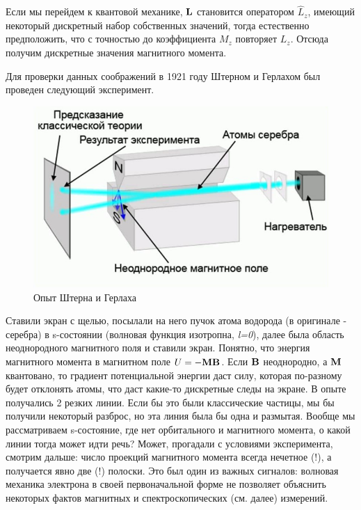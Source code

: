 \par Если мы перейдем к квантовой механике, $\vb{L}$ становится оператором $\hat{L}_z$, имеющий некоторый дискретный набор собственных значений, тогда естественно предположить, что с точностью до коэффициента $M_z$ повторяет $L_z$. Отсюда получим дискретные значения магнитного момента. 
\par Для проверки данных соображений в 1921 году Штерном и Герлахом был проведен следующий эксперимент.
\par \begin{figure} 
\vspace{-2ex}
\centering
\includegraphics[width=1\linewidth]{pictures/31.1.jpg}
\caption{Опыт Штерна и Герлаха}
\end{figure}
\par Ставили экран с щелью, посылали на него пучок атома водорода (в оригинале - серебра) в s-состоянии (волновая функция изотропна, \textit{l=0}), далее была область неоднородного магнитного поля и ставили экран. Понятно, что энергия магнитного момента в магнитном поле $U=- \vb{M}\vb{B}$. Если $\vb{B}$ неоднородно, а $\vb{M}$ квантовано, то градиент потенциальной энергии даст силу, которая по-разному будет отклонять атомы, что даст какие-то дискретные следы на экране. В опыте получались 2 резких линии. Если бы это были классические частицы, мы бы получили некоторый разброс, но эта линия была бы одна и размытая. Вообще мы рассматриваем s-состояние, где нет орбитального и магнитного момента, о какой линии тогда может идти речь? Может, прогадали с условиями эксперимента, смотрим дальше: число проекций магнитного момента всегда нечетное (!), а получается явно две (!) полоски. Это был один из важных сигналов: волновая механика электрона в своей первоначальной форме не позволяет объяснить некоторых фактов магнитных и спектроскопических (см. далее) измерений.

